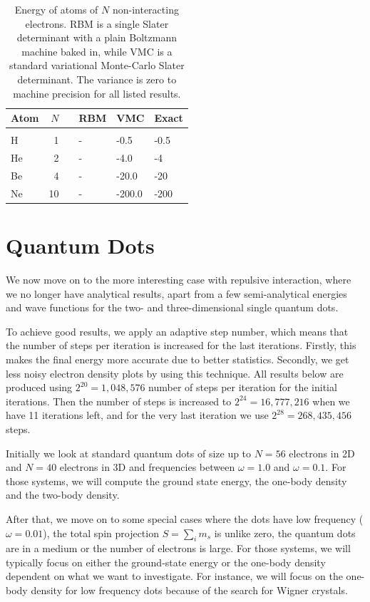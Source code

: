 \begin{table} [H]
	\caption{Energy of atoms of $N$ non-interacting electrons. RBM is a single Slater determinant with a plain Boltzmann machine baked in, while VMC is a standard variational Monte-Carlo Slater determinant. The variance is zero to machine precision for all listed results. }
	\label{tab:atomswointeraction}
	\begin{tabularx}{\textwidth}{lrrR{3.5cm}R{3.5cm}R{3.5cm}} \hline\hline
		Atom & $N$ & \makecell{\\ \phantom{=}} & RBM & VMC & Exact \\ \hline \\
		
		H & 1 && - & -0.5 & -0.5 \\
		He & 2 && - & -4.0 & -4 \\
		Be & 4 && - & -20.0 & -20 \\
		Ne & 10 && - & -200.0 & -200 \\ \hline\hline
	\end{tabularx}
\end{table}

\newpage
\section{Quantum Dots}
We now move on to the more interesting case with repulsive interaction, where we no longer have analytical results, apart from a few semi-analytical energies and wave functions  for the two- and three-dimensional single quantum dots.

To achieve good results, we apply an adaptive step number, which means that the number of steps per iteration is increased for the last iterations. Firstly, this makes the final energy more accurate due to better statistics. Secondly, we get less noisy electron density plots by using this technique. All results below are produced using $2^{20}=1,048,576$ number of steps per iteration for the initial iterations. Then the number of steps is increased to $2^{24}=16,777,216$ when we have 11 iterations left, and for the very last iteration we use $2^{28}=268,435,456$ steps.

Initially we look at standard quantum dots of size up to $N=56$ electrons in 2D and $N=40$ electrons in 3D and frequencies between $\omega=1.0$ and $\omega=0.1$. For those systems, we will compute the ground state energy, the one-body density and the two-body density. 

After that, we move on to some special cases where the dots have low frequency ($\omega=0.01$), the total spin projection $S=\sum_im_s$ is unlike zero, the quantum dots are in a medium or the number of electrons is large. For those systems, we will typically focus on either the ground-state energy or the one-body density dependent on what we want to investigate. For instance, we will focus on the one-body density for low frequency dots because of the search for Wigner crystals. 

